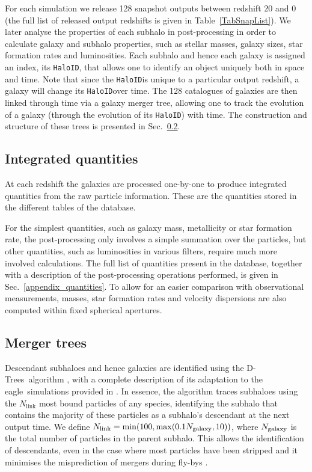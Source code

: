 \documentclass[10pt, a4paper]{article}
\newcommand{\eagle}{{\sc eagle}}
\newcommand{\HaloID}{{\texttt{HaloID}}}
\newcommand{\dtrees}{{\sc D-Trees}}
\begin{document}
For each simulation we release 128 snapshot outputs between redshift $20$ and $0$ (the full list of released output redshifts is given in Table~\ref{TabSnapList}). We later analyse the properties of each subhalo in post-processing in order to calculate galaxy and subhalo properties, such as stellar masses, galaxy sizes, star formation rates and luminosities. Each subhalo and hence each galaxy is assigned an index, its \HaloID, that allows one to identify an object uniquely both in space and time. Note that since the \HaloID is unique to a particular output redshift, a galaxy will change its \HaloID over time. The 128 catalogues of galaxies are then linked through time via a galaxy merger tree, allowing one to track the evolution of a galaxy (through the evolution of its \HaloID) with time. The construction and structure of these trees is presented in Sec.~\ref{SubsecMergerTrees}.

\subsection{Integrated quantities}
At each redshift the galaxies are processed one-by-one to produce integrated quantities from the raw particle information. These are the quantities stored in the different tables of the database.

For the simplest quantities, such as galaxy mass, metallicity or star formation rate, the post-processing only involves a simple summation over the particles, but other quantities, such as luminosities in various filters, require much more involved calculations. The full list of quantities present in the database, together with a description of the post-processing operations performed, is given in Sec.~\ref{appendix_quantities}. To allow for an easier comparison with observational measurements, masses, star formation rates and velocity dispersions are also computed within fixed spherical apertures.

\subsection{Merger trees}
\label{SubsecMergerTrees}

Descendant subhaloes and hence galaxies are identified using the \dtrees\ algorithm \citep{2014MNRAS.440.2115J}, with a complete description of its adaptation to the \eagle\ simulations provided in \citet{2017MNRAS.464.1659Q}. In essence, the algorithm traces subhaloes using the $N_{\text{link}}$ most bound particles of any species, identifying the subhalo that contains the majority of these particles as a subhalo's descendant at the next output time.  We define $N_{\rm link} = \min(100, \max(0.1N_{\rm galaxy}, 10))$, where $N_{\rm galaxy}$ is the total number of particles in the parent subhalo.  This allows the identification of descendants, even in the case where most particles have been stripped and it minimises the misprediction of mergers during fly-bys \citep{2008MNRAS.386..577F,2009ApJ...701.2002G}.
\end{document}
